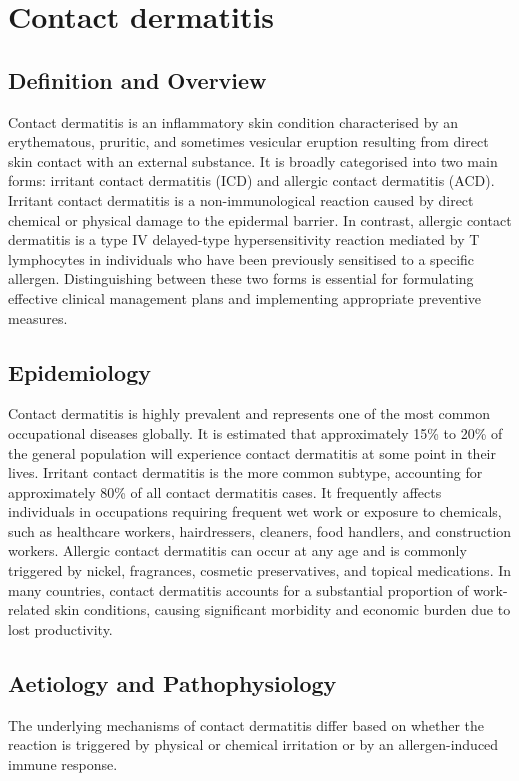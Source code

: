 \chapter{Contact dermatitis}

\section*{Definition and Overview}
Contact dermatitis is an inflammatory skin condition characterised by an erythematous, pruritic, and sometimes vesicular eruption resulting from direct skin contact with an external substance. It is broadly categorised into two main forms: irritant contact dermatitis (ICD) and allergic contact dermatitis (ACD). Irritant contact dermatitis is a non-immunological reaction caused by direct chemical or physical damage to the epidermal barrier. In contrast, allergic contact dermatitis is a type IV delayed-type hypersensitivity reaction mediated by T lymphocytes in individuals who have been previously sensitised to a specific allergen. Distinguishing between these two forms is essential for formulating effective clinical management plans and implementing appropriate preventive measures.

\section*{Epidemiology}
Contact dermatitis is highly prevalent and represents one of the most common occupational diseases globally. It is estimated that approximately 15\% to 20\% of the general population will experience contact dermatitis at some point in their lives. Irritant contact dermatitis is the more common subtype, accounting for approximately 80\% of all contact dermatitis cases. It frequently affects individuals in occupations requiring frequent wet work or exposure to chemicals, such as healthcare workers, hairdressers, cleaners, food handlers, and construction workers. Allergic contact dermatitis can occur at any age and is commonly triggered by nickel, fragrances, cosmetic preservatives, and topical medications. In many countries, contact dermatitis accounts for a substantial proportion of work-related skin conditions, causing significant morbidity and economic burden due to lost productivity.

\section*{Aetiology and Pathophysiology}
The underlying mechanisms of contact dermatitis differ based on whether the reaction is triggered by physical or chemical irritation or by an allergen-induced immune response.

